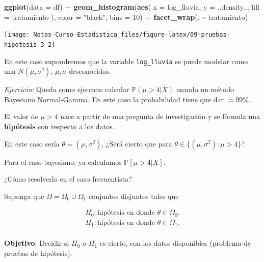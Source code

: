 \documentclass[
  12pt,
]{book}
\newenvironment{Shaded}{\begin{snugshade}}{\end{snugshade}}
\newcommand{\DataTypeTok}[1]{\textcolor[rgb]{0.13,0.29,0.53}{#1}}
\newcommand{\DecValTok}[1]{\textcolor[rgb]{0.00,0.00,0.81}{#1}}
\newcommand{\KeywordTok}[1]{\textcolor[rgb]{0.13,0.29,0.53}{\textbf{#1}}}
\newcommand{\NormalTok}[1]{#1}
\newcommand{\OperatorTok}[1]{\textcolor[rgb]{0.81,0.36,0.00}{\textbf{#1}}}
\newcommand{\StringTok}[1]{\textcolor[rgb]{0.31,0.60,0.02}{#1}}
\begin{document}
\begin{Shaded}
\begin{Highlighting}[]
\KeywordTok{ggplot}\NormalTok{(}\DataTypeTok{data =}\NormalTok{ df) }\OperatorTok{+}
\StringTok{  }\KeywordTok{geom\_histogram}\NormalTok{(}\KeywordTok{aes}\NormalTok{(}
    \DataTypeTok{x =}\NormalTok{ log\_lluvia,}
    \DataTypeTok{y =}\NormalTok{ ..density..,}
    \DataTypeTok{fill =}\NormalTok{ tratamiento}
\NormalTok{  ), }\DataTypeTok{color =} \StringTok{"black"}\NormalTok{, }\DataTypeTok{bins =} \DecValTok{10}\NormalTok{) }\OperatorTok{+}
\StringTok{  }\KeywordTok{facet\_wrap}\NormalTok{(. }\OperatorTok{\textasciitilde{}}\StringTok{ }\NormalTok{tratamiento)}
\end{Highlighting}
\end{Shaded}

\begin{center}\texttt{[image: Notas-Curso-Estadistica\_files/figure-latex/09-pruebas-hipotesis-3-2]} \end{center}

En este caso supondremos que la variable \texttt{log\_lluvia} se puede modelar como una
\(N(\mu,\sigma^2)\), \(\mu,\sigma\) desconocidos.

\emph{Ejercicio:} Queda como ejercicio calcular \(\mathbb P (\mu > 4 \vert X)\)
usando un método Bayesiano Normal-Gamma. En este caso la probabilidad tiene que
dar \(\approx 99\%\).

El valor de \(\mu>4\) nace a partir de una pregunta de investigación y se fórmula
una \textbf{hipótesis} con respecto a los datos.

En este caso sería \(\theta = (\mu,\sigma^2)\), ¿Será cierto que para \(\theta\in\{(\mu,\sigma^2):\mu>4\}\)?

Para el caso bayesiano, ya calculamos \(\mathbb P[\mu>4|X]\).

¿Cómo resolverlo en el caso frecuentista?

Suponga que \(\Omega = \Omega_0 \cup\Omega_1\) conjuntos disjuntos tales que

\begin{align*} 
H_0 : \text{hipótesis en donde }\theta \in \Omega_0.\\ H_1 :
\text{hipótesis en donde }\theta \in \Omega_1.\\ 
\end{align*}

\textbf{Objetivo}. Decidir si \(H_0\) o \(H_1\) es cierto, con los datos disponibles
(problema de pruebas de hipótesis).
\end{document}

